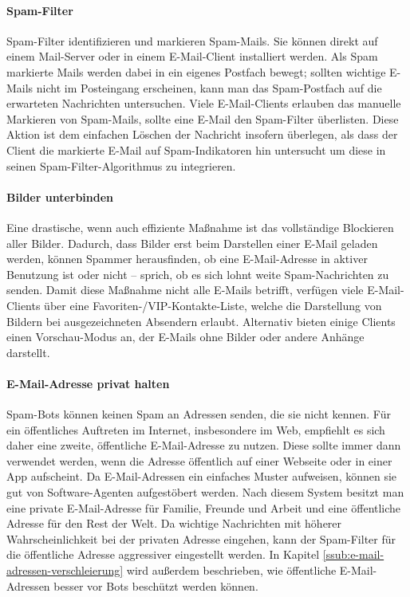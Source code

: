 \paragraph{Spam-Filter}
\label{par:spam-filter}

Spam-Filter identifizieren und markieren Spam-Mails. Sie können direkt auf
einem Mail-Server oder in einem E-Mail-Client installiert werden. Als Spam
markierte Mails werden dabei in ein eigenes Postfach bewegt; sollten wichtige
E-Mails nicht im Posteingang erscheinen, kann man das Spam-Postfach auf die
erwarteten Nachrichten untersuchen. Viele E-Mail-Clients erlauben das manuelle
Markieren von Spam-Mails, sollte eine E-Mail den Spam-Filter überlisten. Diese
Aktion ist dem einfachen Löschen der Nachricht insofern überlegen, als dass der
Client die markierte E-Mail auf Spam-Indikatoren hin untersucht um diese in
seinen Spam-Filter-Algorithmus zu integrieren.

\paragraph{Bilder unterbinden}
\label{par:bilder-unterbinden}

Eine drastische, wenn auch effiziente Maßnahme ist das vollständige Blockieren
aller Bilder. Dadurch, dass Bilder erst beim Darstellen einer E-Mail geladen
werden, können Spammer herausfinden, ob eine E-Mail-Adresse in aktiver
Benutzung ist oder nicht -- sprich, ob es sich lohnt weite Spam-Nachrichten zu
senden. Damit diese Maßnahme nicht alle E-Mails betrifft, verfügen viele
E-Mail-Clients über eine Favoriten-/VIP-Kontakte-Liste, welche die Darstellung
von Bildern bei ausgezeichneten Absendern erlaubt. Alternativ bieten einige
Clients einen Vorschau-Modus an, der E-Mails ohne Bilder oder andere Anhänge
darstellt.

\paragraph{E-Mail-Adresse privat halten}
\label{par:e-mail-adresse-privat-halten}

Spam-Bots können keinen Spam an Adressen senden, die sie nicht kennen. Für ein
öffentliches Auftreten im Internet, insbesondere im Web, empfiehlt es sich
daher eine zweite, öffentliche E-Mail-Adresse zu nutzen. Diese sollte immer
dann verwendet werden, wenn die Adresse öffentlich auf einer Webseite oder in
einer App aufscheint. Da E-Mail-Adressen ein einfaches Muster aufweisen, können
sie gut von Software-Agenten aufgestöbert werden. Nach diesem System besitzt
man eine private E-Mail-Adresse für Familie, Freunde und Arbeit und eine
öffentliche Adresse für den Rest der Welt. Da wichtige Nachrichten mit höherer
Wahrscheinlichkeit bei der privaten Adresse eingehen, kann der Spam-Filter für
die öffentliche Adresse aggressiver eingestellt werden. In Kapitel
\ref{ssub:e-mail-adressen-verschleierung} wird außerdem beschrieben, wie
öffentliche E-Mail-Adressen besser vor Bots beschützt werden können.

